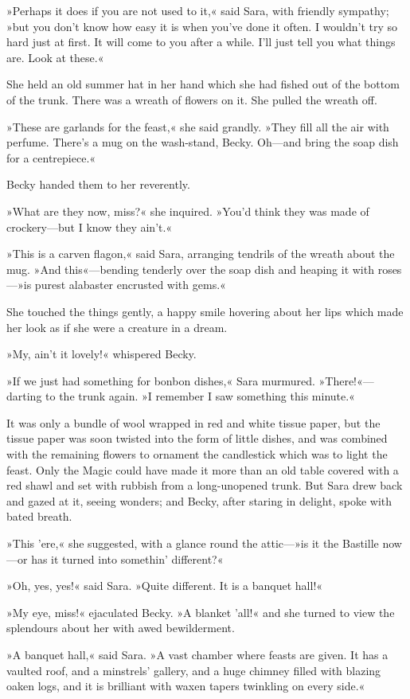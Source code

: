 »Perhaps it does if you are not used to it,« said Sara, with friendly sympathy; »but you don't know how easy it is when you've done it often. I wouldn't try so hard just at first. It will come to you after a while. I'll just tell you what things are. Look at these.«

She held an old summer hat in her hand which she had fished out of the bottom of the trunk. There was a wreath of flowers on it. She pulled the wreath off.

»These are garlands for the feast,« she said grandly. »They fill all the air with perfume. There's a mug on the wash-stand, Becky. Oh—and bring the soap dish for a centrepiece.«

Becky handed them to her reverently.

»What are they now, miss?« she inquired. »You'd think they was made of crockery—but I know they ain't.«

»This is a carven flagon,« said Sara, arranging tendrils of the wreath about the mug. »And this«—bending tenderly over the soap dish and heaping it with roses—»is purest alabaster encrusted with gems.«

She touched the things gently, a happy smile hovering about her lips which made her look as if she were a creature in a dream.

»My, ain't it lovely!« whispered Becky.

»If we just had something for bonbon dishes,« Sara murmured. »There!«—darting to the trunk again. »I remember I saw something this minute.«

It was only a bundle of wool wrapped in red and white tissue paper, but the tissue paper was soon twisted into the form of little dishes, and was combined with the remaining flowers to ornament the candlestick which was to light the feast. Only the Magic could have made it more than an old table covered with a red shawl and set with rubbish from a long-unopened trunk. But Sara drew back and gazed at it, seeing wonders; and Becky, after staring in delight, spoke with bated breath.

»This 'ere,« she suggested, with a glance round the attic—»is it the Bastille now—or has it turned into somethin' different?«

»Oh, yes, yes!« said Sara. »Quite different. It is a banquet hall!«

»My eye, miss!« ejaculated Becky. »A blanket 'all!« and she turned to view the splendours about her with awed bewilderment.

»A banquet hall,« said Sara. »A vast chamber where feasts are given. It has a vaulted roof, and a minstrels' gallery, and a huge chimney filled with blazing oaken logs, and it is brilliant with waxen tapers twinkling on every side.«

